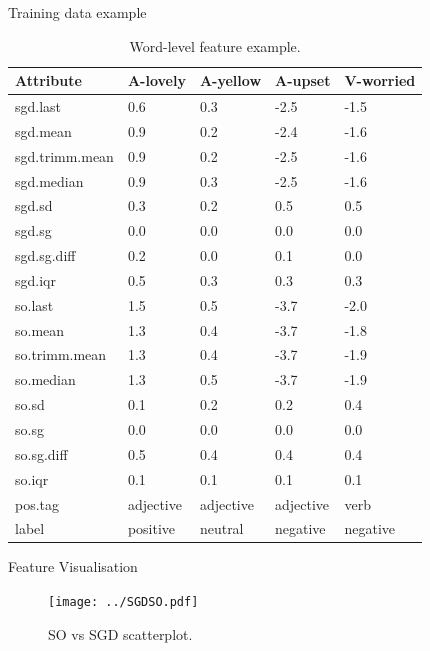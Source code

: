 \documentclass[handout]{beamer}
\begin{document}
\begin{frame}{Training data example}
\begin{scriptsize}
\begin{table}[htb]
\scriptsize
\centering
\begin{tabular}{l|llll}
  \hline
Attribute & A-lovely & A-yellow & A-upset & V-worried \\ 
  \hline
sgd.last &  0.6 &  0.3 & -2.5 & -1.5 \\ 
  sgd.mean &  0.9 &  0.2 & -2.4 & -1.6 \\ 
  sgd.trimm.mean &  0.9 &  0.2 & -2.5 & -1.6 \\ 
  sgd.median &  0.9 &  0.3 & -2.5 & -1.6 \\ 
  sgd.sd & 0.3 & 0.2 & 0.5 & 0.5 \\ 
  sgd.sg & 0.0 & 0.0 & 0.0 & 0.0 \\ 
  sgd.sg.diff & 0.2 & 0.0 & 0.1 & 0.0 \\ 
  sgd.iqr & 0.5 & 0.3 & 0.3 & 0.3 \\ 
  so.last &  1.5 &  0.5 & -3.7 & -2.0 \\ 
  so.mean &  1.3 &  0.4 & -3.7 & -1.8 \\ 
  so.trimm.mean &  1.3 &  0.4 & -3.7 & -1.9 \\ 
  so.median &  1.3 &  0.5 & -3.7 & -1.9 \\ 
  so.sd & 0.1 & 0.2 & 0.2 & 0.4 \\ 
  so.sg & 0.0 & 0.0 & 0.0& 0.0 \\ 
  so.sg.diff & 0.5 & 0.4 & 0.4 & 0.4 \\ 
  so.iqr & 0.1 & 0.1 & 0.1 & 0.1 \\ 
  pos.tag & adjective & adjective & adjective & verb \\ \hline
  label & positive & neutral & negative & negative \\ 
   \hline
\end{tabular}
\caption{Word-level feature example.}
\label{fig:featex}
\end{table}
\end{scriptsize}

\end{frame}


\begin{frame}{Feature Visualisation}
\begin{scriptsize}
\begin{figure}[htb]
	\centering
	 \texttt{[image: ../SGDSO.pdf]}
	\caption{SO vs SGD scatterplot.}
	\label{fig:sosgd}
\end{figure}
\end{scriptsize}

\end{frame}
\end{document}
